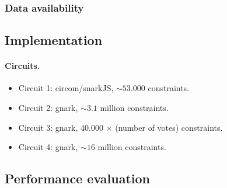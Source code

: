

\subsubsection{Data availability}

\subsection{Implementation}
\label{sec:analysis:implementation}


\paragraph{Circuits.}
\begin{itemize}
	\item Circuit 1: circom/snarkJS, $\sim 53.000$ constraints.
	\item Circuit 2: gnark, $\sim 3.1$ million constraints.
	\item Circuit 3: gnark, 40.000 $\times$ (number of votes) constraints.
	\item Circuit 4: gnark, $\sim 16$ million constraints.
\end{itemize}

\subsection{Performance evaluation}
\label{sec:analysis:performance-evaluation}

